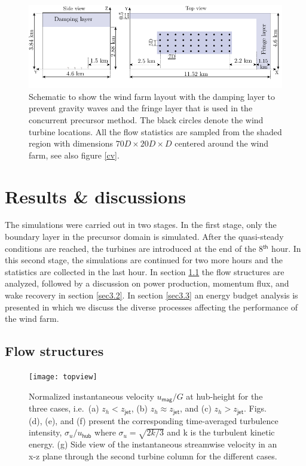 \documentclass[%
 aip,
 amsmath,amssymb,
preprint,%
author-numerical,%
]{revtex4-1}
\begin{document}
\begin{figure} 
 \centering
 \includegraphics[width=\linewidth]{fig2}
 \vspace{-1.3cm}
 \caption{Schematic to show the wind farm layout with the damping layer to prevent gravity waves and the fringe layer that is used in the concurrent precursor method. The black circles denote the wind turbine locations. All the flow statistics are sampled from the shaded region with dimensions $70D\times{20D}\times{D}$ centered around the wind farm, see also figure \ref{cv}.}
 \label{fig2}
\end{figure}

\section{Results \& discussions}\label{sec3}
The simulations were carried out in two stages. In the first stage, only the boundary layer in the precursor domain is simulated. After the quasi-steady conditions are reached, the turbines are introduced at the end of the 8$^\mathsf{th}$ hour. In this second stage, the simulations are continued for two more hours and the statistics are collected in the last hour. In section \ref{sec3.1} the flow structures are analyzed, followed by a discussion on power production, momentum flux, and wake recovery in section \ref{sec3.2}. In section \ref{sec3.3} an energy budget analysis is presented in which we discuss the diverse processes affecting the performance of the wind farm.

\subsection{Flow structures}\label{sec3.1}
\begin{figure}
 \centering
 \texttt{[image: topview]}
 \vspace{-1.0cm}
 \caption{Normalized instantaneous velocity $u_\mathsf{mag}/G$ at hub-height for the three cases, i.e.\ (a) $z_h < z_\mathsf{jet}$, (b) $z_h \approx z_\mathsf{jet}$, and (c) $z_h > z_\mathsf{jet}$. Figs. (d), (e), and (f) present the corresponding time-averaged turbulence intensity, $\sigma_{u}/u_\mathsf{hub}$ where $\sigma_{u}=\sqrt{2k/3}$ and k is the turbulent kinetic energy. (g) Side view of the instantaneous streamwise velocity in an x-z plane through the second turbine column for the different cases.}
 \label{topview}
\end{figure}
\end{document}
